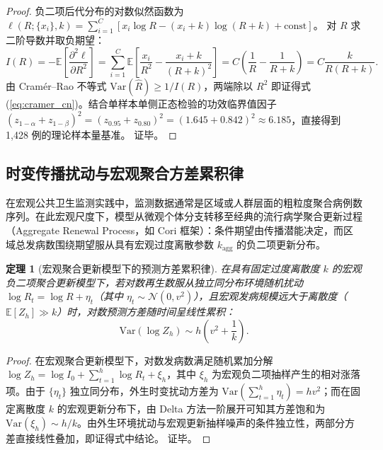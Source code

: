 \documentclass[11pt,a4paper]{article}
\theoremstyle{plain}
\newtheorem{theorem}{定理}
\theoremstyle{definition}
\begin{document}
\begin{proof}
负二项后代分布的对数似然函数为 $\ell(R; \{x_i\}, k) = \sum_{i=1}^C [x_i \log R - (x_i + k)\log(R+k) + \text{const}]$。
对 $R$ 求二阶导数并取负期望：
\begin{equation}
I(R) = -\mathbb{E}\left[\frac{\partial^2 \ell}{\partial R^2}\right] = \sum_{i=1}^C \mathbb{E}\left[\frac{x_i}{R^2} - \frac{x_i + k}{(R+k)^2}\right] = C \left(\frac{1}{R} - \frac{1}{R+k}\right) = C \frac{k}{R(R+k)}.
\end{equation}
由 Cram\'er--Rao 不等式 $\text{Var}(\hat{R}) \ge 1/I(R)$，两端除以 $R^2$ 即证得式 (\ref{eq:cramer_cn})。结合单样本单侧正态检验的功效临界值因子 $(z_{1-\alpha} + z_{1-\beta})^2 = (z_{0.95} + z_{0.80})^2 = (1.645 + 0.842)^2 \approx 6.185$，直接得到 1,428 例的理论样本量基准。
证毕。
\end{proof}

\subsection{时变传播扰动与宏观聚合方差累积律}

在宏观公共卫生监测实践中，监测数据通常是区域或人群层面的粗粒度聚合病例数序列。在此宏观尺度下，模型从微观个体分支转移至经典的流行病学聚合更新过程（Aggregate Renewal Process，如 Cori 框架）：条件期望由传播潜能决定，而区域总发病数围绕期望服从具有宏观过度离散参数 $k_{\text{agg}}$ 的负二项更新分布。

\begin{theorem}[宏观聚合更新模型下的预测方差累积律]\label{thm:t5}
在具有固定过度离散度 $k$ 的宏观负二项聚合更新模型下，若对数再生数服从独立同分布环境随机扰动 $\log R_t = \log R + \eta_t$（其中 $\eta_t \sim \mathcal{N}(0, v^2)$），且宏观发病规模远大于离散度（$\mathbb{E}[Z_h] \gg k$）时，对数预测方差随时间呈线性累积：
\begin{equation}
\text{Var}(\log Z_h) \sim h \left(v^2 + \frac{1}{k}\right).
\end{equation}
\end{theorem}

\begin{proof}
在宏观聚合更新模型下，对数发病数满足随机累加分解 $\log Z_h = \log I_0 + \sum_{t=1}^h \log R_t + \xi_h$，其中 $\xi_h$ 为宏观负二项抽样产生的相对涨落项。由于 $\{\eta_t\}$ 独立同分布，外生时变扰动方差为 $\text{Var}(\sum_{t=1}^h \eta_t) = h v^2$；而在固定离散度 $k$ 的宏观更新分布下，由 Delta 方法一阶展开可知其方差饱和为 $\text{Var}(\xi_h) \sim h/k$。由外生环境扰动与宏观更新抽样噪声的条件独立性，两部分方差直接线性叠加，即证得式中结论。
证毕。
\end{proof}
\end{document}
